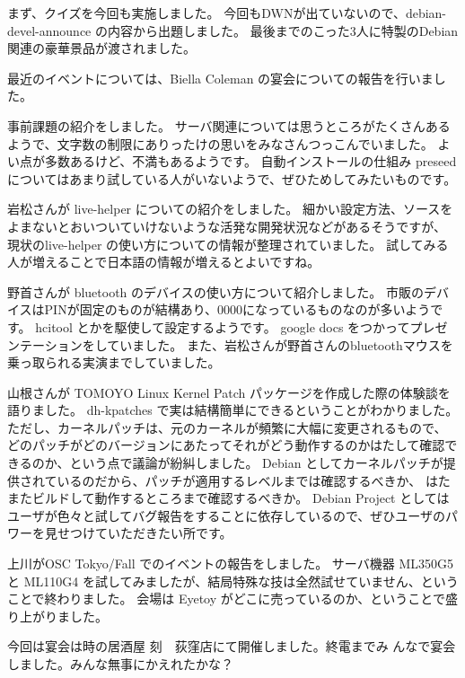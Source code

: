 \documentclass[mingoth,a4paper]{jsarticle}
\begin{document}
	
	  
	    まず、クイズを今回も実施しました。
	    今回もDWNが出ていないので、debian-devel-announce の内容から出題しました。
	    最後までのこった3人に特製のDebian関連の豪華景品が渡されました。
	  
	  
	    最近のイベントについては、Biella Coleman の宴会についての報告を行いました。
	  
	  
	    事前課題の紹介をしました。
	    サーバ関連については思うところがたくさんあるようで、文字数の制限にありったけの思いをみなさんつっこんでいました。
	    よい点が多数あるけど、不満もあるようです。
	    自動インストールの仕組み preseed についてはあまり試している人がいないようで、ぜひためしてみたいものです。
	  
	  
	    岩松さんが live-helper についての紹介をしました。
	    細かい設定方法、ソースをよまないとおいついていけないような活発な開発状況などがあるそうですが、
	    現状のlive-helper の使い方についての情報が整理されていました。
	    試してみる人が増えることで日本語の情報が増えるとよいですね。
	  
	  
	    野首さんが bluetooth のデバイスの使い方について紹介しました。
	    市販のデバイスはPINが固定のものが結構あり、0000になっているものなのが多いようです。
	    hcitool とかを駆使して設定するようです。
	    google docs をつかってプレゼンテーションをしていました。
	    また、岩松さんが野首さんのbluetoothマウスを乗っ取られる実演までしていました。
	  
	  
	    山根さんが TOMOYO Linux Kernel Patch パッケージを作成した際の体験談を語りました。
	    dh-kpatches で実は結構簡単にできるということがわかりました。
	    ただし、カーネルパッチは、元のカーネルが頻繁に大幅に変更されるもので、
	    どのパッチがどのバージョンにあたってそれがどう動作するのかはたして確認できるのか、という点で議論が紛糾しました。
	    Debian としてカーネルパッチが提供されているのだから、パッチが適用するレベルまでは確認するべきか、
	    はたまたビルドして動作するところまで確認するべきか。
	    Debian Project としてはユーザが色々と試してバグ報告をすることに依存しているので、ぜひユーザのパワーを見せつけていただきたい所です。
	  
	  
	    上川がOSC Tokyo/Fall でのイベントの報告をしました。
	    サーバ機器 ML350G5 と ML110G4 を試してみましたが、結局特殊な技は全然試せていません、ということで終わりました。
	    会場は Eyetoy がどこに売っているのか、ということで盛り上がりました。
	  
	  
	    今回は宴会は時の居酒屋 刻　荻窪店にて開催しました。終電までみ
	      んなで宴会しました。みんな無事にかえれたかな？
\end{document}
